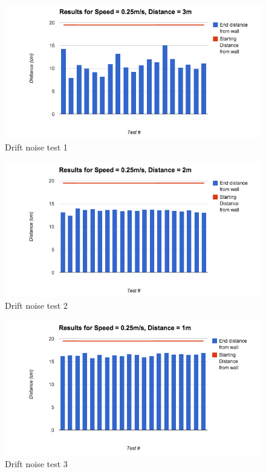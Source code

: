 \documentclass{article}
\begin{document}
	\begin{figure}[H]
	\centering
	\includegraphics[width=\linewidth]{ExperimentalResults4}
	\caption{Drift noise test 1}
	\end{figure}
	\begin{figure}[H]
	\centering
	\includegraphics[width=\linewidth]{ExperimentalResults5}
	\caption{Drift noise test 2}
	\end{figure}
	\begin{figure}[H]
	\centering
	\includegraphics[width=\linewidth]{ExperimentalResults6}
	\caption{Drift noise test 3}
	\end{figure}
	
\end{document}
